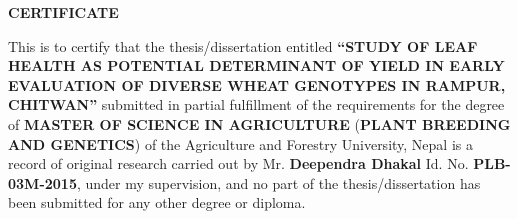 \clearpage
  {\fontsize{12}{14}
  \centerline{\bfseries CERTIFICATE}
  \thispagestyle{empty}
  \null\vspace*{2cm}

  \begingroup
  This is to certify that the thesis/dissertation entitled \textbf{``STUDY OF LEAF HEALTH AS POTENTIAL DETERMINANT OF YIELD IN EARLY EVALUATION OF DIVERSE WHEAT GENOTYPES IN RAMPUR, CHITWAN''} submitted in partial fulfillment of the requirements for the degree of \textbf{MASTER OF SCIENCE IN AGRICULTURE} (\textbf{PLANT BREEDING AND GENETICS}) of the Agriculture and Forestry University, Nepal is a record of original research carried out by Mr. \textbf{Deependra Dhakal} Id. No. \textbf{PLB-03M-2015}, under my supervision, and no part of the thesis/dissertation has been submitted for any other degree or diploma.
  \endgroup
  
  \vskip 1in		%
  
  
  \clearpage
}


